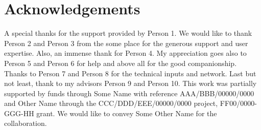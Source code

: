 
\section{Acknowledgements}
\label{sec:sec012}

A special thanks for the support provided by Person 1. We would like to thank Person 2 and Person 3 from the some place for the generous support and user expertise. Also, an immense thank for Person 4. My appreciation goes also to Person 5 and Person 6 for help and above all for the good companionship. Thanks to Person 7 and Person 8 for the technical inputs and network. Last but not least, thank to my advisors Person 9 and Person 10. This work was partially supported by funds through Some Name with reference AAA/BBB/00000/0000 and Other Name through the CCC/DDD/EEE/00000/0000 project, FF00/0000-GGG-HH grant. We would like to convey Some Other Name for the collaboration.
